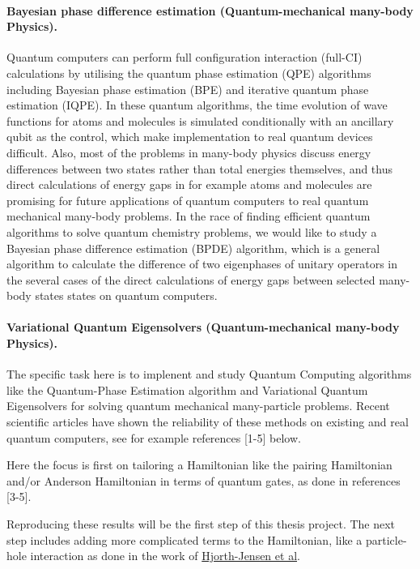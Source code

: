 \documentclass[%
oneside,                 %
final,                   %
10pt]{article}
\begin{document}
\noindent
\paragraph{Bayesian phase difference estimation (Quantum-mechanical many-body Physics).}
Quantum computers can perform full configuration interaction (full-CI)
calculations by utilising the quantum phase estimation (QPE)
algorithms including Bayesian phase estimation (BPE) and iterative
quantum phase estimation (IQPE). In these quantum algorithms, the time
evolution of wave functions for atoms and molecules is simulated
conditionally with an ancillary qubit as the control, which make
implementation to real quantum devices difficult. Also, most of the
problems in many-body physics discuss energy differences between two
states rather than total energies themselves, and thus
direct calculations of energy gaps in for example atoms and molecules are promising for future
applications of quantum computers to real quantum mechanical many-body problems. In the
race of finding efficient quantum algorithms to solve quantum
chemistry problems, we would like to study  a Bayesian phase difference estimation
(BPDE) algorithm, which is a general algorithm to calculate the
difference of two eigenphases of unitary operators in the several
cases of the direct calculations of energy gaps between selected many-body states
states on quantum computers.


\paragraph{Variational Quantum Eigensolvers (Quantum-mechanical many-body Physics).}
The specific task here is to implenent and study Quantum Computing
algorithms like the Quantum-Phase Estimation algorithm and Variational
Quantum Eigensolvers for solving quantum mechanical many-particle
problems.  Recent scientific articles have shown the reliability of
these methods on existing and real quantum computers, see for example
references [1-5] below.


Here the focus is first on tailoring a Hamiltonian like the pairing
Hamiltonian and/or Anderson Hamiltonian in terms of quantum gates, as
done in references [3-5].

Reproducing these results will be the first step of this thesis
project. The next step includes adding more complicated terms to the
Hamiltonian, like a particle-hole interaction as done in the work of
\href{{http://iopscience.iop.org/article/10.1088/0954-3899/37/6/064035/meta}}{Hjorth-Jensen et
al}.
\end{document}
